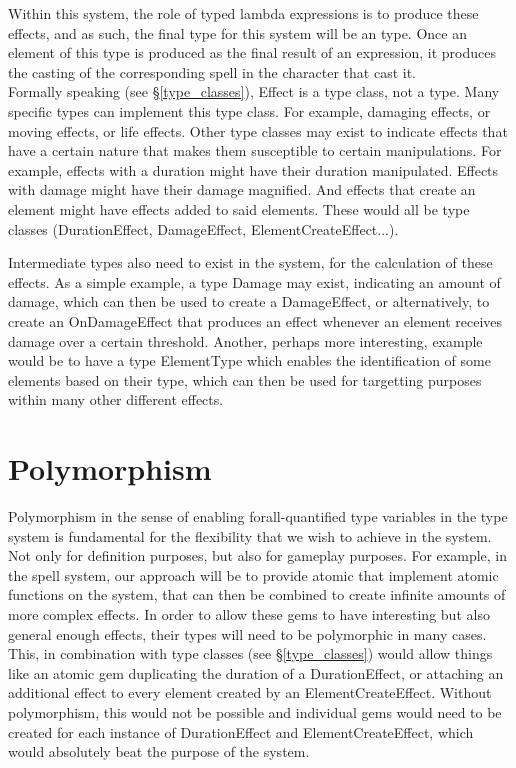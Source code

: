 \documentclass[12pt,a4paper]{article}
\begin{document}
Within this system, the role of typed lambda expressions is to produce these effects, and as such, the final type for this system will be an  type. Once an element of this type is produced as the final result of an expression, it produces the casting of the corresponding spell in the character that cast it.\\

Formally speaking (see \S \ref{type_classes}), Effect is a type class, not a type. Many specific types can implement this type class. For example, damaging effects, or moving effects, or life effects. Other type classes may exist to indicate effects that have a certain nature that makes them susceptible to certain manipulations. For example, effects with a duration might have their duration manipulated. Effects with damage might have their damage magnified. And effects that create an element might have effects added to said elements. These would all be type classes (DurationEffect, DamageEffect, ElementCreateEffect...).

Intermediate types also need to exist in the system, for the calculation of these effects. As a simple example, a type Damage may exist, indicating an amount of damage, which can then be used to create a DamageEffect, or alternatively, to create an OnDamageEffect that produces an effect whenever an element receives damage over a certain threshold. Another, perhaps more interesting, example would be to have a type ElementType which enables the identification of some elements based on their type, which can then be used for targetting purposes within many other different effects.\\

\section{Polymorphism}

Polymorphism in the sense of enabling forall-quantified type variables in the type system is fundamental for the flexibility that we wish to achieve in the system. Not only for definition purposes, but also for gameplay purposes. For example, in the spell system, our approach will be to provide atomic  that implement atomic functions on the system, that can then be combined to create infinite amounts of more complex effects. In order to allow these gems to have interesting but also general enough effects, their types will need to be polymorphic in many cases. This, in combination with type classes (see \S \ref{type_classes}) would allow things like an atomic gem duplicating the duration of a DurationEffect, or attaching an additional effect to every element created by an ElementCreateEffect. Without polymorphism, this would not be possible and individual gems would need to be created for each instance of DurationEffect and ElementCreateEffect, which would absolutely beat the purpose of the system.
\end{document}
